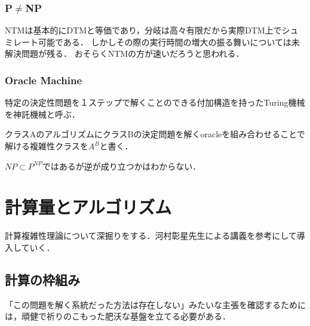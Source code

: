 \documentclass[uplatex, dvipdfmx]{jsreport}
\begin{document}
\subsection{P$\ne$NP}
NTMは基本的にDTMと等価であり，分岐は高々有限だから実際DTM上でシュミレート可能である．
しかしその際の実行時間の増大の振る舞いについては未解決問題が残る．
おそらくNTMの方が速いだろうと思われる．

\begin{example}
    
\end{example}

\subsection{Oracle Machine}
\begin{definition}
    特定の決定性問題を１ステップで解くことのできる付加構造を持ったTuring機械を神託機械と呼ぶ．
\end{definition}
\begin{notation}
    クラスAのアルゴリズムにクラスBの決定問題を解くoracleを組み合わせることで解ける複雑性クラスを$A^B$と書く．
\end{notation}
$NP\subset P^{NP}$ではあるが逆が成り立つかはわからない．

\chapter{計算量とアルゴリズム}
計算複雑性理論について深掘りをする．河村彰星先生による講義を参考にして導入していく．

\section{計算の枠組み}
「この問題を解く系統だった方法は存在しない」みたいな主張を確認するためには，頑健で祈りのこもった肥沃な基盤を立てる必要がある．
\end{document}
